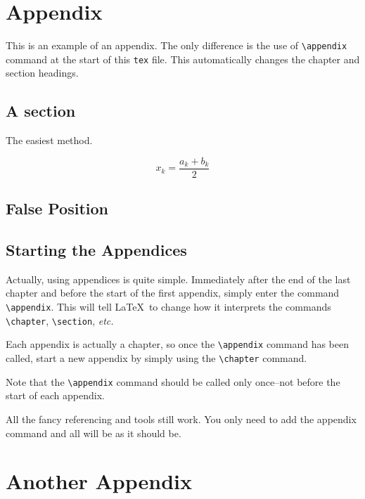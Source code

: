 \appendix
\doublespacing
\chapter{Appendix}
This is an example of an appendix. 
The only difference is the use of \verb+\appendix+ command at the start of this \texttt{tex} file. 
This automatically changes the chapter and section headings.

\section{A section}
The easiest method.

\begin{equation}\label{eq:sum}
    x_k = \frac{a_k+b_k}{2}
\end{equation}

\section{False Position}
\lipsum[20]


\section{Starting the Appendices}
Actually, using appendices is quite simple.  Immediately after the end
of the last chapter and before the start of the first appendix, simply
enter the command \verb|\appendix|.  This will tell \LaTeX~to change
how it interprets the commands \verb|\chapter|, \verb|\section|,
\textit{etc.}

Each appendix is actually a chapter, so once the \verb|\appendix|
command has been called, start a new appendix by simply using the
\verb|\chapter| command.

Note that the \verb|\appendix| command should be called only
once--not before the start of each appendix.

All the fancy referencing and tools still work.
You only need to add the appendix command and all will be as it should be.

\chapter{Another Appendix}
\lipsum[24]
